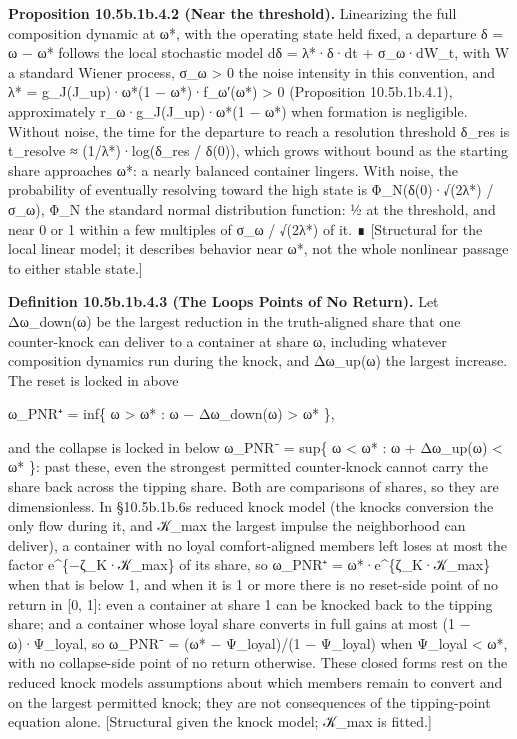 \documentclass[
]{article}
\begin{document}
\textbf{Proposition 10.5b.1b.4.2 (Near the threshold).} Linearizing the
full composition dynamic at ω*, with the operating state held fixed, a
departure δ = ω − ω* follows the local stochastic model dδ = λ*·δ·dt +
σ\_ω·dW\_t, with W a standard Wiener process, σ\_ω \textgreater{} 0 the
noise intensity in this convention, and λ* = g\_J(J\_up)·ω*(1 −
ω*)·f\_ω′(ω*) \textgreater{} 0 (Proposition 10.5b.1b.4.1), approximately
r\_ω·g\_J(J\_up)·ω*(1 − ω*) when formation is negligible. Without noise,
the time for the departure to reach a resolution threshold δ\_res is
t\_resolve ≈ (1/λ*)·log(δ\_res / \textbar δ(0)\textbar), which grows
without bound as the starting share approaches ω*: a nearly balanced
container lingers. With noise, the probability of eventually resolving
toward the high state is Φ\_N(δ(0)·√(2λ*) / σ\_ω), Φ\_N the standard
normal distribution function: ½ at the threshold, and near 0 or 1 within
a few multiples of σ\_ω / √(2λ*) of it. ∎ {[}Structural for the local
linear model; it describes behavior near ω*, not the whole nonlinear
passage to either stable state.{]}

\textbf{Definition 10.5b.1b.4.3 (The Loop\textquotesingle s Points of No
Return).} Let Δω\_down(ω) be the largest reduction in the truth-aligned
share that one counter-knock can deliver to a container at share ω,
including whatever composition dynamics run during the knock, and
Δω\_up(ω) the largest increase. The reset is locked in above

ω\_PNR⁺ = inf\{ ω \textgreater{} ω* : ω − Δω\_down(ω) \textgreater{} ω*
\},

and the collapse is locked in below ω\_PNR⁻ = sup\{ ω \textless{} ω* : ω
+ Δω\_up(ω) \textless{} ω* \}: past these, even the strongest permitted
counter-knock cannot carry the share back across the tipping share. Both
are comparisons of shares, so they are dimensionless. In
§10.5b.1b.6\textquotesingle s reduced knock model (the
knock\textquotesingle s conversion the only flow during it, and 𝒦\_max
the largest impulse the neighborhood can deliver), a container with no
loyal comfort-aligned members left loses at most the factor
e\^{}\{−ζ\_K·𝒦\_max\} of its share, so ω\_PNR⁺ = ω*·e\^{}\{ζ\_K·𝒦\_max\}
when that is below 1, and when it is 1 or more there is no reset-side
point of no return in {[}0, 1{]}: even a container at share 1 can be
knocked back to the tipping share; and a container whose loyal share
converts in full gains at most (1 − ω)·Ψ\_loyal, so ω\_PNR⁻ = (ω* −
Ψ\_loyal)/(1 − Ψ\_loyal) when Ψ\_loyal \textless{} ω*, with no
collapse-side point of no return otherwise. These closed forms rest on
the reduced knock model\textquotesingle s assumptions about which
members remain to convert and on the largest permitted knock; they are
not consequences of the tipping-point equation alone. {[}Structural
given the knock model; 𝒦\_max is fitted.{]}
\end{document}
